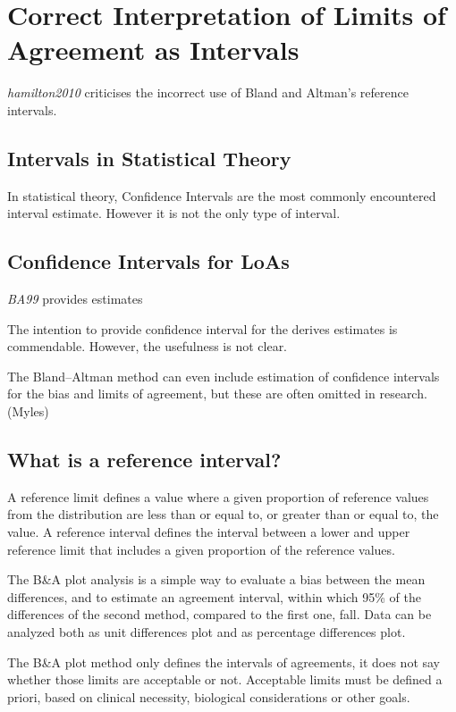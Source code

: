 \documentclass[]{report}
\begin{document}
\section{Correct Interpretation of Limits of Agreement as Intervals}	
	
\textit{hamilton2010} criticises the incorrect use of Bland and Altman's reference intervals.


\subsection*{Intervals in Statistical Theory}
In statistical theory, Confidence Intervals are the most commonly encountered interval estimate. However it is not the only type of interval.

\subsection*{Confidence Intervals for LoAs}

\textit{BA99} provides estimates


The intention to provide confidence interval for the derives estimates is commendable. However, the usefulness is not clear.


The Bland–Altman method can even include estimation of confidence intervals for the bias and limits of agreement, but these are often omitted in research. (Myles)



\subsection*{What is a reference interval?}


A reference limit defines a value where a given proportion of reference values from the distribution are less than or equal to, or greater than or equal to, the value. A reference interval defines the interval between a lower and upper reference limit that includes a given proportion of the reference values.

The B\&A plot analysis is a simple way to evaluate a bias between the mean differences, and to estimate an agreement interval, within which 95\% of the differences of the second method, compared to the first one, fall. Data can be analyzed both as unit differences plot and as percentage differences plot.

The B\&A plot method only defines the intervals of agreements, it does not say whether those limits are acceptable or not. Acceptable limits must be defined a priori, based on clinical necessity, biological considerations or other goals.
\end{document}
